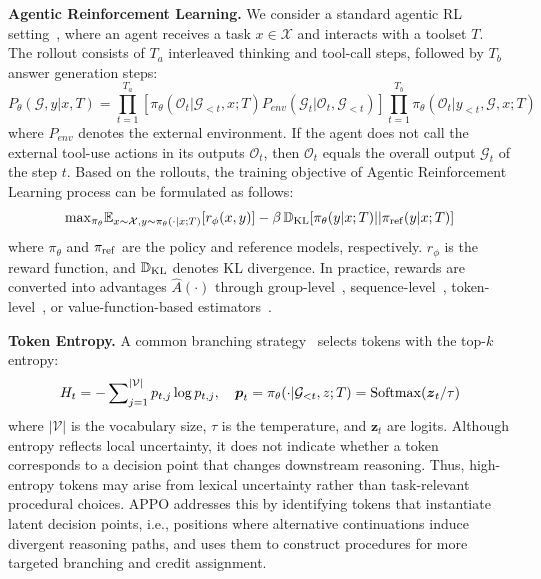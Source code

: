 \documentclass{llmxive}
\providecommand{\bm}[1]{\boldsymbol{#1}}
\begin{document}
\noindent\textbf{Agentic Reinforcement Learning.}
We consider a standard agentic RL setting~\cite{gou2023tora,li2025torl,wu2025agentic,dong2025tool,su2025toolorchestra,qian2025toolrl}, where an agent receives a task $x\in\mathcal{X}$ and interacts with a toolset $T$. The rollout consists of $T_a$ interleaved thinking and tool-call steps, followed by $T_b$ answer generation steps:
\begin{equation}
P_\theta(\mathcal{G},y|x,T)=\prod_{t=1}^{T_a}[\pi_\theta(\mathcal{O}_{t}|\mathcal{G}_{<t},x;T)P_{env}(\mathcal{G}_t|\mathcal{O}_{t},\mathcal{G}_{<t})]\prod_{t=1}^{T_b}\pi_\theta(\mathcal{O}_{t}|y_{<t},\mathcal{G},x;T)
\end{equation}
where $P_{env}$ denotes the external environment. If the agent does not call the external tool-use actions in its outputs $\mathcal{O}_{t}$, then $\mathcal{O}_{t}$ equals the overall output $\mathcal{G}_t$ of the step $t$. Based on the rollouts, the training objective of Agentic Reinforcement Learning process can be formulated as follows:
\begin{equation}
    {\rm max}_{\pi_\theta}\mathbb{E}_{x\sim\mathcal{X},y\sim\pi_\theta(\cdot|x;T)}[r_\phi(x,y)]-\beta\,\mathbb{D}_{\rm KL}[\pi_\theta(y|x;T)||\pi_{\rm ref}(y|x;T)]
\end{equation}
where $\pi_\theta$ and $\pi_{\rm ref}$ are the policy and reference models, respectively. $r_\phi$ is the reward function, and $\mathbb{D}_{\rm KL}$ denotes KL divergence. In practice, rewards are converted into advantages $\hat{A}(\cdot)$ through group-level~\cite{shao2024deepseekmath,guo2025deepseek,liu2025understanding}, sequence-level~\cite{zheng2025group}, token-level~\cite{yu2025dapo}, or value-function-based estimators~\cite{schulman2017proximal}.

\vspace{0.3em}
\noindent\textbf{Token Entropy.}
A common branching strategy~\cite{dong2025agentic,dong2025agentic1,hou2025treerl} selects tokens with the top-$k$ entropy:
\begin{equation}
    H_t=-\sum\nolimits_{j=1}^{|\mathcal{V}|}p_{t,j}\log p_{t,j}, \quad \bm{p}_t=\pi_\theta(\cdot|\mathcal{G}_{<t},z;T)={\rm Softmax}(\bm{z}_t/\tau)
\end{equation}
where $|\mathcal{V}|$ is the vocabulary size, $\tau$ is the temperature, and $\bm{z}_t$ are logits. Although entropy reflects local uncertainty, it does not indicate whether a token corresponds to a decision point that changes downstream reasoning. Thus, high-entropy tokens may arise from lexical uncertainty rather than task-relevant procedural choices. APPO addresses this by identifying tokens that instantiate latent decision points, i.e., positions where alternative continuations induce divergent reasoning paths, and uses them to construct procedures for more targeted branching and credit assignment.
\end{document}
